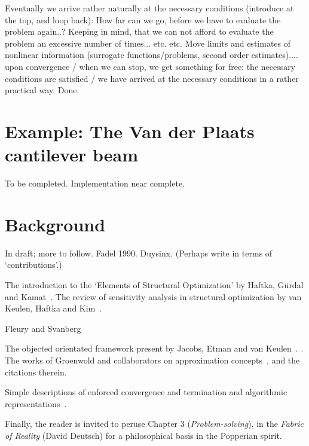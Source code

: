 \documentclass[11pt]{article}
\begin{document}

Eventually we arrive rather naturally at the necessary conditions (introduce at the top, and loop back): How far can we go, before we have to evaluate the problem again..? Keeping in mind, that we can not afford to evaluate the problem an excessive number of times... etc. etc. Move limits and estimates of nonlinear information (surrogate functions/problems, second order estimates).... upon convergence / when we can stop, we get something for free: the necessary conditions are satisfied / we have arrived at the necessary conditions in a rather practical way. Done.

\section*{Example: The Van der Plaats cantilever beam}

To be completed. Implementation near complete.


\section*{Background}

In draft; more to follow. Fadel 1990. Duysinx. (Perhaps write in terms of `contributions'.)

The introduction to the `Elements of Structural Optimization' by Haftka, G\"urdal and Kamat~\cite{haftka1990}. The review of sensitivity analysis in structural optimization by van Keulen, Haftka and Kim~\cite{keulen2005}. 

Fleury \cite{fleury1986structural,fleury1989conlin} and Svanberg \cite{Svanberg1987method}

The objected orientated framework present by Jacobs, Etman and van Keulen~\cite{jacobs2004framework}. \cite{groenwold2011saoi}. The works of Groenwold and collaborators on approximation concepts~\cite{groenwold2010quadratic,groenwold2010approximated,groenwold2008equivalence,groenwold2007incomplete,etman2012first,lutchman2014using,groenwold2008sequential,etman2009diagonal,wood2009non,etman2006sequential}, and the citations therein.

Simple descriptions of enforced convergence and termination and algorithmic representations~\cite{groenwold2010conditional,groenwold2009globally,park2014globally,svanberg2002class}.

Finally, the reader is invited to peruse Chapter 3 (\emph{Problem-solving}), in the \emph{Fabric of Reality} (David Deutsch) for a philosophical basis in the Popperian spirit. 

 
 
\end{document}
